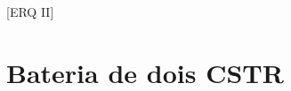 \documentclass[\mainfilename]{subfiles}
\begin{document}

[ERQ II]
{} %
{} %

\section*{Bateria de dois CSTR}
\end{document}
